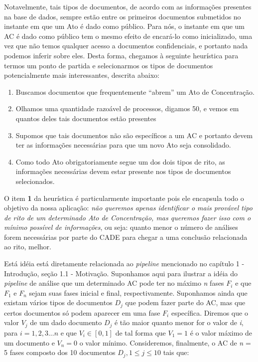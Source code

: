 \documentclass[11pt]{report}
\newcommand{\quotes}[1]{``#1''}
\begin{document}
Notavelmente, tais tipos de documentos, de acordo com as informações presentes na base de dados, sempre estão entre os primeiros documentos submetidos no instante em que um
Ato é dado como público. Para nós, o instante em que um AC é dado como público tem o mesmo efeito de encará-lo como inicializado, uma vez que não temos qualquer acesso
a documentos confidenciais, e portanto nada podemos inferir sobre eles.
Desta forma, chegamos à seguinte heurística para termos um ponto de partida e selecionarmos os tipos de documentos potencialmente mais interessantes, descrita abaixo:

\begin{enumerate}[label=\textbf{\arabic*.}]
\item Buscamos documentos que frequentemente \quotes{abrem} um Ato de Concentração.
\item Olhamos uma quantidade razoável de processos, digamos 50, e vemos em quantos deles tais documentos estão presentes
\item Supomos que tais documentos não são específicos a um AC e portanto devem ter as informações necessárias para que um novo Ato seja consolidado.
\item Como todo Ato obrigatoriamente segue um dos dois tipos de rito, as informações necessárias devem estar presente nos tipos de documentos selecionados.
\end{enumerate}

O item \textbf{1} da heurística é particularmente importante pois ele encapsula todo o objetivo da nossa aplicação: \textit{não queremos apenas identificar o mais provável tipo de rito
de um determinado Ato de Concentração, mas queremos fazer isso com o mínimo possível de informações}, ou seja: quanto menor o número de análises forem
necessárias por parte do CADE para chegar a uma conclusão relacionada ao rito, melhor.

Está idéia está diretamente relacionada ao \textit{pipeline} mencionado no capítulo 1 - Introdução, seção 1.1 - Motivação. Suponhamos aqui para ilustrar a idéia do
\textit{pipeline} de análise que um determinado AC pode ter no máximo \textit{n} fases $F_i$ e que $F_1$ e $F_n$ sejam suas fases inicial e final, respectivamente.
Suponhamos ainda que existam vários tipos de documentos $D_j$ que podem fazer parte do AC, mas que certos documentos só podem aparecer em uma fase $F_i$ específica.
Diremos que o valor $V_j$ de um dado documento $D_j$ é tão maior quanto menor for o valor de \textit{i}, para $i = 1, 2, 3 ... n$ e que $V_i \in [0, 1]$ de tal
forma que $V_1 = 1$ é o valor máximo de um documento e $V_n = 0$ o valor mínimo.
Consideremos, finalmente, o AC de \textit{n} = 5 fases composto dos 10 documentos $D_j, 1 \leq j \leq 10$ tais que:
\end{document}
